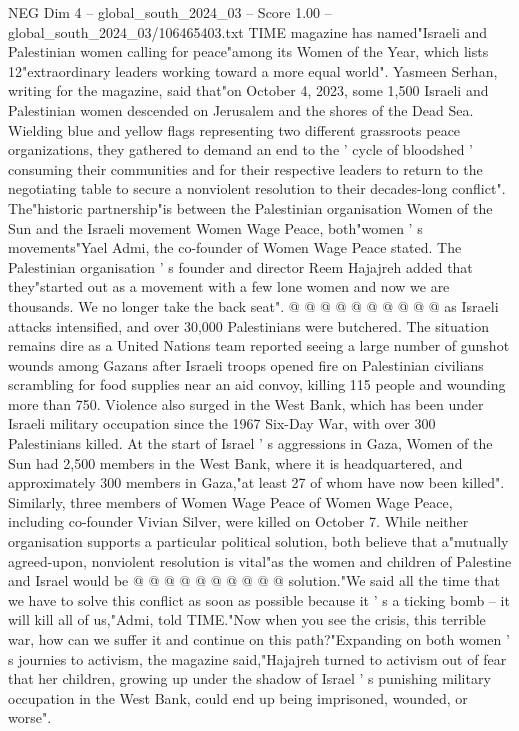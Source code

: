 \begin{textsample}{NEG Dim 4 – global\_south\_2024\_03 – Score 1.00 – global\_south\_2024\_03/106465403.txt}  \label{ex:f4_neg_360}
TIME magazine has named"Israeli and Palestinian women calling for peace"among its Women of the Year, which lists 12"extraordinary leaders working toward a more equal world".
Yasmeen Serhan, writing for the magazine, said that"on October 4, 2023, some 1,500 Israeli and Palestinian women descended on Jerusalem and the shores of the Dead Sea.
Wielding blue and yellow flags representing two different grassroots peace organizations, they gathered to demand an end to the ' cycle of bloodshed ' consuming their communities and for their respective leaders to return to the negotiating table to secure a nonviolent resolution to their decades-long conflict".
The"historic partnership"is between the Palestinian organisation Women of the Sun and the Israeli movement Women Wage Peace, both"women ' s movements"Yael Admi, the co-founder of Women Wage Peace stated.
The Palestinian organisation ' s founder and director Reem Hajajreh added that they"started out as a movement with a few lone women and now we are thousands.
We no longer take the back seat". @ @ @ @ @ @ @ @ @ @ as Israeli attacks intensified, and over 30,000 Palestinians were butchered.
The situation remains dire as a United Nations team reported seeing a large number of gunshot wounds among Gazans after Israeli troops opened fire on Palestinian civilians scrambling for food supplies near an aid convoy, killing 115 people and wounding more than 750.
Violence also surged in the West Bank, which has been under Israeli military occupation since the 1967 Six-Day War, with over 300 Palestinians killed.
At the start of Israel ' s aggressions in Gaza, Women of the Sun had 2,500 members in the West Bank, where it is headquartered, and approximately 300 members in Gaza,"at least 27 of whom have now been killed".
Similarly, three members of Women Wage Peace of Women Wage Peace, including co-founder Vivian Silver, were killed on October 7.
While neither organisation supports a particular political solution, both believe that a"mutually agreed-upon, nonviolent resolution is vital"as the women and children of Palestine and Israel would be @ @ @ @ @ @ @ @ @ @ solution."We said all the time that we have to solve this conflict as soon as possible because it ' s a ticking bomb -- it will kill all of us,"Admi, told TIME."Now when you see the crisis, this terrible war, how can we suffer it and continue on this path?"Expanding on both women ' s journies to activism, the magazine said,"Hajajreh turned to activism out of fear that her children, growing up under the shadow of Israel ' s punishing military occupation in the West Bank, could end up being imprisoned, wounded, or worse".

\end{textsample}
